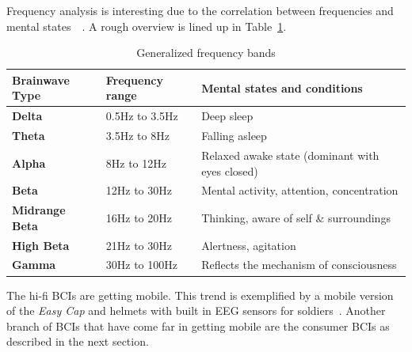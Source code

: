 \documentclass[a4paper,10pt,english,lof,lot,twoside]{puthesis}
\begin{document}
Frequency analysis is interesting due to the correlation between frequencies and
mental states \cite{hammond_what_2007} \cite{rangaswamy_beta_2002}. A rough overview is lined up in Table \ref{ch-background/index:table-background-frequency-bands}.


\begin{table}
\capstart
\begin{center}

\begin{tabular}{l l l}

\toprule
\textsf{\relax 
Brainwave Type
} & \textsf{\relax 
Frequency range
} & \textsf{\relax 
Mental states and conditions
}\\
\hline\midrule

\textbf{Delta}
 & 
0.5Hz to 3.5Hz
 & 
Deep sleep
\\

\textbf{Theta}
 & 
3.5Hz to 8Hz
 & 
Falling asleep
\\

\textbf{Alpha}
 & 
8Hz to 12Hz
 & 
Relaxed awake state (dominant with eyes closed)
\\

\textbf{Beta}
 & 
12Hz to 30Hz
 & 
Mental activity, attention, concentration
\\

\textbf{Midrange
Beta}
 & 
16Hz to 20Hz
 & 
Thinking, aware of self \& surroundings
\\

\textbf{High Beta}
 & 
21Hz to 30Hz
 & 
Alertness, agitation
\\

\textbf{Gamma}
 & 
30Hz to 100Hz
 & 
Reflects the mechanism of consciousness
\\
\hline\bottomrule

\end{tabular}
\caption[Generalized frequency bands]{Generalized frequency bands}\label{ch-background/index:table-background-frequency-bands}
\end{center}
\end{table}

The hi-fi BCIs are getting mobile. This trend is exemplified by a mobile version
of the \emph{Easy Cap} and helmets with built in EEG sensors for soldiers \cite{matthews_real_2008}. Another branch of BCIs that have come far in
getting mobile are the consumer BCIs as described in the next section.
\end{document}
